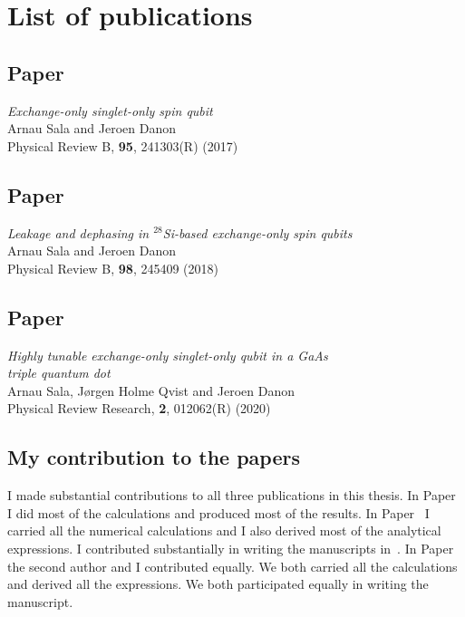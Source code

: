 \chapter*{List of publications}



\section*{Paper~\cite{Sala2017}}

\textit{Exchange-only singlet-only spin qubit}\\
Arnau Sala and Jeroen Danon\\
Physical Review B, \textbf{95}, 241303(R) (2017)


\section*{Paper~\cite{Sala2018}}

\textit{Leakage and dephasing in $^{28}$Si-based exchange-only spin qubits}\\
Arnau Sala and Jeroen Danon\\
Physical Review B, \textbf{98}, 245409 (2018)


\section*{Paper~\cite{Sala2020}}

\textit{Highly tunable exchange-only singlet-only qubit in a GaAs \\triple quantum dot}\\
Arnau Sala, J{\o}rgen Holme Qvist and Jeroen Danon\\
Physical Review Research, \textbf{2}, 012062(R) (2020)


\clearpage

\section*{My contribution to the papers}


I made substantial contributions to all three publications in this thesis. In Paper~\cite{Sala2017} I did most of the calculations and produced most of the results. In Paper~\cite{Sala2018} I carried all the numerical calculations and I also derived most of the analytical expressions. I contributed substantially in writing the manuscripts in~\cite{Sala2017,Sala2018}. In Paper~\cite{Sala2020} the second author and I contributed equally. We both carried all the calculations and derived all the expressions. We both participated equally in writing the manuscript.
















